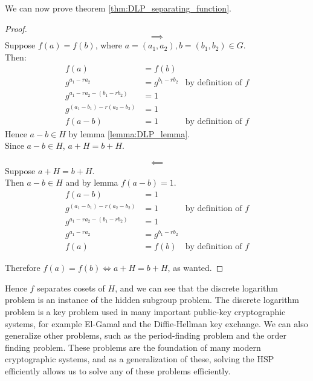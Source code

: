 \documentclass{article}
\theoremstyle{plain}
\theoremstyle{centered}
\begin{document}
        We can now prove theorem \ref{thm:DLP_separating_function}.
        \begin{proof}
                        $$\implies$$
                Suppose $f(a) = f(b)$, where $a = (a_1, a_2), b = (b_1, b_2) \in G$.\\
                Then:
                \begin{align*}
                        f(a) &= f(b)\\
                        g^{a_1 - r a_2} &= g^{b_1 - r b_2} & \text{by definition of $f$}\\
                        g^{a_1 - r a_2 - (b_1 - r b_2)} &= 1\\
                        g^{(a_1 - b_1) - r(a_2 - b_2)} &= 1\\
                        f(a - b) &= 1 & \text{by definition of $f$}
                \end{align*}
                Hence $a - b \in H$ by lemma \ref{lemma:DLP_lemma}.\\
                Since $a - b \in H$, $a + H = b + H$.

                        $$\impliedby$$
                Suppose $a + H = b + H$.\\
                Then $a - b \in H$ and by lemma $f(a - b) = 1$.
                \begin{align*}
                        f(a - b) &= 1\\
                        g^{(a_1 - b_1) - r(a_2 - b_2)} &= 1 & \text{by definition of $f$}\\
                        g^{a_1 - ra_2 - (b_1 - rb_2)} &= 1\\
                        g^{a_1 - ra_2} &= g^{b_1 - r b_2}\\
                        f(a) &= f(b) & \text{by definition of $f$}
                \end{align*}
                
                Therefore $f(a) = f(b) \iff a + H = b + H$, as wanted.
        \end{proof}
        Hence $f$ separates cosets of $H$, and we can see that the discrete logarithm problem is an instance of the hidden subgroup problem.
        The discrete logarithm problem is a key problem used in many important public-key cryptographic systems, for example El-Gamal and the Diffie-Hellman key exchange.
        We can also generalize other problems, such as the period-finding problem and the order finding problem.
        These problems are the foundation of many modern cryptographic systems, and as a generalization of these, solving the HSP efficiently allows us to solve any of these problems efficiently.
\end{document}
